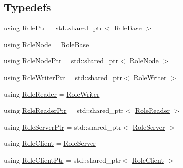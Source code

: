 \subsection*{Typedefs}
\begin{DoxyCompactItemize}
\item 
using \hyperlink{namespaceapollo_1_1cyber_1_1service__discovery_a47c65bbb4b41d9ae41bfbd33271df525}{Role\-Ptr} = std\-::shared\-\_\-ptr$<$ \hyperlink{classapollo_1_1cyber_1_1service__discovery_1_1RoleBase}{Role\-Base} $>$
\item 
using \hyperlink{namespaceapollo_1_1cyber_1_1service__discovery_a215a77a4c98a99914680e6234f6a3806}{Role\-Node} = \hyperlink{classapollo_1_1cyber_1_1service__discovery_1_1RoleBase}{Role\-Base}
\item 
using \hyperlink{namespaceapollo_1_1cyber_1_1service__discovery_ab1151fabf4ca79506ed917781c500b5e}{Role\-Node\-Ptr} = std\-::shared\-\_\-ptr$<$ \hyperlink{namespaceapollo_1_1cyber_1_1service__discovery_a215a77a4c98a99914680e6234f6a3806}{Role\-Node} $>$
\item 
using \hyperlink{namespaceapollo_1_1cyber_1_1service__discovery_ad246cadc25c6cbfc2320ab309b5c60f4}{Role\-Writer\-Ptr} = std\-::shared\-\_\-ptr$<$ \hyperlink{classapollo_1_1cyber_1_1service__discovery_1_1RoleWriter}{Role\-Writer} $>$
\item 
using \hyperlink{namespaceapollo_1_1cyber_1_1service__discovery_a5d6b4379a39ee25ab414b1b2a8998e28}{Role\-Reader} = \hyperlink{classapollo_1_1cyber_1_1service__discovery_1_1RoleWriter}{Role\-Writer}
\item 
using \hyperlink{namespaceapollo_1_1cyber_1_1service__discovery_a59f1f32faed73356751837c33e6a34fa}{Role\-Reader\-Ptr} = std\-::shared\-\_\-ptr$<$ \hyperlink{namespaceapollo_1_1cyber_1_1service__discovery_a5d6b4379a39ee25ab414b1b2a8998e28}{Role\-Reader} $>$
\item 
using \hyperlink{namespaceapollo_1_1cyber_1_1service__discovery_a247914445b59846191483e1e1f2005a6}{Role\-Server\-Ptr} = std\-::shared\-\_\-ptr$<$ \hyperlink{classapollo_1_1cyber_1_1service__discovery_1_1RoleServer}{Role\-Server} $>$
\item 
using \hyperlink{namespaceapollo_1_1cyber_1_1service__discovery_a2578fbdec532dea479a355ace565a5af}{Role\-Client} = \hyperlink{classapollo_1_1cyber_1_1service__discovery_1_1RoleServer}{Role\-Server}
\item 
using \hyperlink{namespaceapollo_1_1cyber_1_1service__discovery_a9321a2a191c847f9b5e7704201a18ca2}{Role\-Client\-Ptr} = std\-::shared\-\_\-ptr$<$ \hyperlink{namespaceapollo_1_1cyber_1_1service__discovery_a2578fbdec532dea479a355ace565a5af}{Role\-Client} $>$

\end{DoxyCompactItemize}
